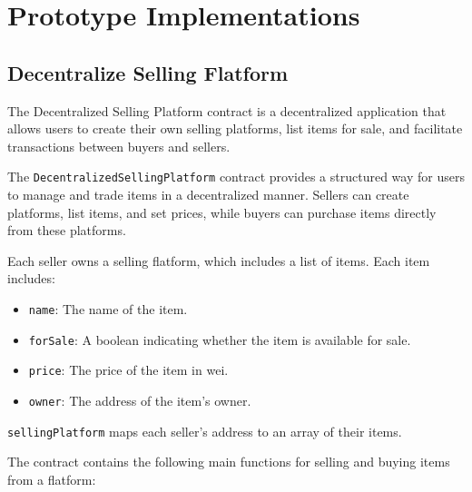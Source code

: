 \documentclass[runningheads]{llncs}
\begin{document}
\section{Prototype Implementations}
\subsection{Decentralize Selling Flatform}
The Decentralized Selling Platform contract is a decentralized application that allows users to create their own selling platforms, list items for sale, and facilitate transactions between buyers and sellers.

The \texttt{DecentralizedSellingPlatform} contract provides a structured way for users to manage and trade items in a decentralized manner. Sellers can create platforms, list items, and set prices, while buyers can purchase items directly from these platforms. %

Each seller owns a selling flatform, which includes a list of items. Each item includes:
\begin{itemize}
    \item \texttt{name}: The name of the item.
    \item \texttt{forSale}: A boolean indicating whether the item is available for sale.
    \item \texttt{price}: The price of the item in wei.
    \item \texttt{owner}: The address of the item's owner.
\end{itemize}

\texttt{sellingPlatform} maps each seller's address to an array of their items.

The contract contains the following main functions for selling and buying items from a flatform:
\end{document}
